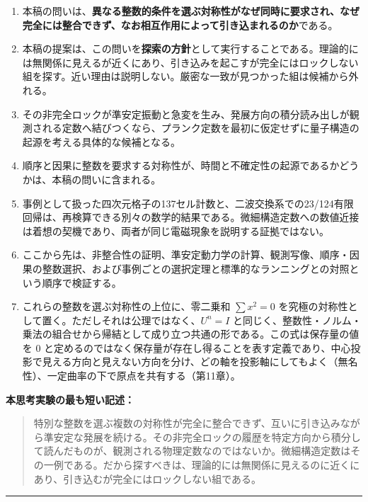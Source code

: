 \documentclass[
  a4paper,
]{ltjsarticle}
\providecommand{\tightlist}{%
  \setlength{\itemsep}{0pt}\setlength{\parskip}{0pt}}
\begin{document}
\begin{enumerate}
\def\labelenumi{\arabic{enumi}.}
\tightlist
\item
  本稿の問いは、\textbf{異なる整数的条件を選ぶ対称性がなぜ同時に要求され、なぜ完全には整合できず、なお相互作用によって引き込まれるのか}である。
\item
  本稿の提案は、この問いを\textbf{探索の方針}として実行することである。理論的には無関係に見えるが近くにあり、引き込みを起こすが完全にはロックしない組を探す。近い理由は説明しない。厳密な一致が見つかった組は候補から外れる。
\item
  その非完全ロックが準安定振動と急変を生み、発展方向の積分読み出しが観測される定数へ結びつくなら、プランク定数を最初に仮定せずに量子構造の起源を考える具体的な候補となる。
\item
  順序と因果に整数を要求する対称性が、時間と不確定性の起源であるかどうかは、本稿の問いに含まれる。
\item
  事例として扱った四次元格子の137セル計数と、二波交換系での23/124有限回帰は、再検算できる別々の数学的結果である。微細構造定数への数値近接は着想の契機であり、両者が同じ電磁現象を説明する証拠ではない。
\item
  ここから先は、非整合性の証明、準安定動力学の計算、観測写像、順序・因果の整数選択、および事例ごとの選択定理と標準的なランニングとの対照という順序で検証する。
\item
  これらの整数を選ぶ対称性の上位に、零二乗和 \(\sum x^2=0\)
  を究極の対称性として置く。ただしそれは公理ではなく、\(U^n=I\)
  と同じく、整数性・ノルム・乗法の組合せから帰結として成り立つ共通の形である。この式は保存量の値を
  0
  と定めるのではなく保存量が存在し得ることを表す定義であり、中心投影で見える方向と見えない方向を分け、どの軸を投影軸にしてもよく（無名性）、一定曲率の下で原点を共有する（第11章）。
\end{enumerate}

\textbf{本思考実験の最も短い記述：}

\begin{quote}
特別な整数を選ぶ複数の対称性が完全に整合できず、互いに引き込みながら準安定な発展を続ける。その非完全ロックの履歴を特定方向から積分して読んだものが、観測される物理定数なのではないか。微細構造定数はその一例である。だから探すべきは、理論的には無関係に見えるのに近くにあり、引き込むが完全にはロックしない組である。
\end{quote}

\begin{center}\rule{0.5\linewidth}{0.5pt}\end{center}
\end{document}
